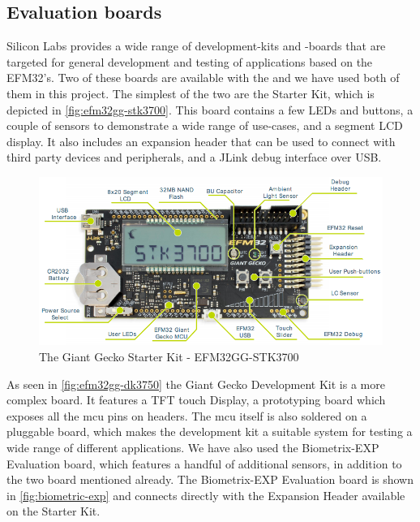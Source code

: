 \subsection{Evaluation boards}

Silicon Labs provides a wide range of development-kits and -boards that are targeted for general development and testing of applications based on the EFM32's.
Two of these boards are available with the {\gecko} and we have used both of them in this project.
The simplest of the two are the  Starter Kit, which is depicted in \autoref{fig:efm32gg-stk3700}.
This board contains a few LEDs and buttons, a couple of sensors to demonstrate a wide range of use-cases, and a segment LCD display.
It also includes an expansion header that can be used to connect with third party devices and peripherals, and a JLink debug interface over USB.

\begin{figure}[H]
  \begin{center}
    \includegraphics[scale=0.4]{figures/efm32gg-stk3700}
  \end{center}
  \caption{The Giant Gecko Starter Kit - EFM32GG-STK3700 \cite{Labs2013_STK} }
  \label{fig:efm32gg-stk3700}
\end{figure}

As seen in \autoref{fig:efm32gg-dk3750} the Giant Gecko Development Kit is a more complex board.
It features a TFT touch Display, a prototyping board which exposes all the \gls{mcu} pins on headers.
The \gls{mcu} itself is also soldered on a pluggable board, which makes the development kit a suitable system for testing a wide range of different applications.
We have also used the Biometrix-EXP Evaluation board, which features a handful of additional sensors, in addition to the two board mentioned already.
The Biometrix-EXP Evaluation board is shown in \autoref{fig:biometric-exp} and connects directly with the Expansion Header available on the Starter Kit.

